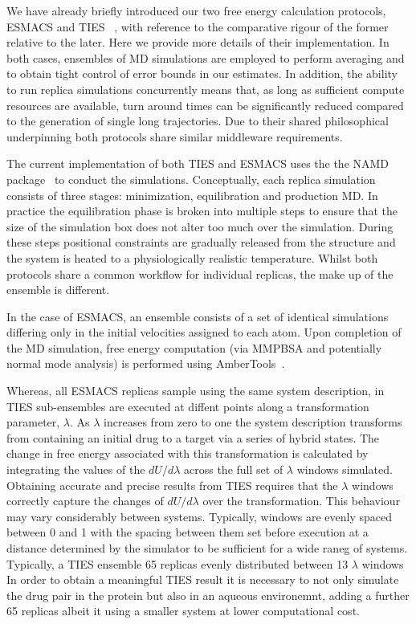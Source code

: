 We have already briefly introduced our two free energy calculation 
protocols, ESMACS and TIES ~\cite{Wan2017brd4, Bhati2017}, with reference to the comparative rigour of the former relative to the later. 
Here we provide more details of their implementation.
In both cases, ensembles of MD simulations are employed to perform averaging and to obtain tight control of error bounds in our estimates. 
In addition, the ability to run replica simulations concurrently means that, as long as sufficient compute resources are available, turn around times can be significantly reduced compared to the generation of single long trajectories.
Due to their shared philosophical underpinning both protocols share similar middleware requirements.

The current implementation of both TIES and ESMACS uses the the NAMD 
package~\cite{Phillips2005} to conduct the simulations.
Conceptually, each replica simulation consists of three stages: minimization, equilibration 
and production MD.
In practice the equilibration phase is broken into multiple steps to ensure that the size of the 
simulation box does not alter too much over the simulation.
During these steps positional constraints are gradually released from the structure and the 
system is heated to a physiologically realistic temperature.
Whilst both protocols share a common workflow for individual replicas, the make up of the 
ensemble is different.

In the case of ESMACS, an ensemble consists of a set of identical simulations differing only in
the initial velocities assigned to each atom.
Upon completion of the MD simulation, free energy computation (via MMPBSA and potentially normal 
mode analysis) is performed using AmberTools~\cite{amber14, Case2005, MillerIII2012}.

Whereas, all ESMACS replicas sample using the same system description, in TIES sub-ensembles are executed 
at diffent points along a transformation parameter, $\lambda$.
As $\lambda$ increases from zero to one the system description transforms from containing an 
initial drug to a target via a series of hybrid states.
The change in free energy associated with this transformation is calculated by integrating the 
values of the $dU/d\lambda$ across the full set of $\lambda$ windows simulated.
Obtaining accurate and precise results from TIES requires that the $\lambda$ windows correctly 
capture the changes of $dU/d\lambda$ over the transformation.
This behaviour may vary considerably between systems.
Typically, windows are evenly spaced between 0 and 1 with the spacing between them set before 
execution at a distance determined by the simulator to be sufficient for a wide raneg of systems. 
Typically, a TIES ensemble 65 replicas evenly distributed between 13 $\lambda$ windows
In order to obtain a meaningful TIES result it is necessary to not only simulate the drug pair 
in the protein but also in an aqueous environemnt, adding a further 65 replicas albeit it using a
smaller system at lower computational cost.

